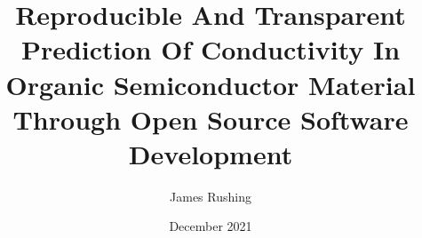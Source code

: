 \documentclass[12pt]{report}
\begin{document}
\author{James Rushing}
\title{Reproducible And Transparent Prediction Of Conductivity In Organic Semiconductor Material Through Open Source Software Development} %
\date{December 2021}
\maketitle
\makecopyright
\submittalsheet
\setcounter{page}{4}
%

%

\tableofcontents
\end{document}
